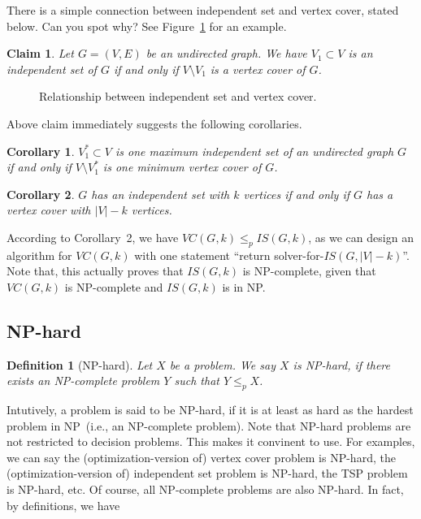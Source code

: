 \documentclass[letterpaper,11pt]{article}
\theoremstyle{mytheorem}
\newtheorem{definition}{Definition}
\newtheorem{claim}{Claim}
\newtheorem{corollary}{Corollary}
\begin{document}
There is a simple connection between independent set and vertex cover, stated below. Can you spot why?
See Figure~\ref{fig:is} for an example.

\begin{claim}
Let $G = (V, E)$ be an undirected graph. We have $V_1\subset V$ is an independent set of $G$ if and only if $V\setminus V_1$ is a vertex cover of $G$.
\end{claim}

\begin{figure}[!h]
\centering{}
\caption{Relationship between independent set and vertex cover.}
\label{fig:is}
\end{figure}

Above claim immediately suggests the following corollaries.
\begin{corollary}
$V_1^*\subset V$ is one maximum independent set of an undirected graph $G$ if and only if $V\setminus V_1^*$ is one minimum vertex cover of $G$.
\end{corollary}
\begin{corollary}
$G$ has an independent set with $k$ vertices if and only if $G$ has a vertex cover with $|V|-k$ vertices.
\end{corollary}

According to Corollary~2, we have $VC(G, k) \le_p IS(G, k)$, as we can design an algorithm for $VC(G,k)$ with one statement ``return solver-for-$IS(G,|V|-k)$''.
Note that, this actually proves that $IS(G,k)$ is NP-complete, given that $VC(G,k)$ is NP-complete and $IS(G,k)$ is in NP.

\subsection*{NP-hard}

\begin{definition}[NP-hard]
Let $X$ be a problem. We say $X$ is NP-hard, if there exists an NP-complete problem $Y$ such that $Y\le_p X$.
\end{definition}

Intutively, a problem is said to be NP-hard, if it is at least as hard as the hardest problem in NP~(i.e., an NP-complete problem).
Note that NP-hard problems are not restricted to decision problems. This makes it convinent to use. For examples, 
we can say the (optimization-version of) vertex cover problem is NP-hard,
the (optimization-version of) independent set problem is NP-hard,
the TSP problem is NP-hard, etc.
Of course, all NP-complete problems are also NP-hard. In fact, by definitions, we have
\end{document}

